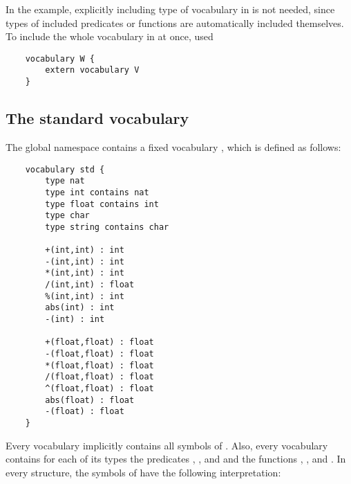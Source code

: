 
In the example, explicitly including type  of vocabulary  in  is not needed, since types of included predicates or functions are automatically included themselves.  To include the whole vocabulary  in  at once, used
\begin{lstlisting}
	vocabulary W {
		extern vocabulary V
	}
\end{lstlisting}




\subsection{The standard vocabulary}

The global namespace contains a fixed vocabulary , which is defined as follows:

\begin{lstlisting}
	vocabulary std {
		type nat	
		type int contains nat
		type float contains int
		type char
		type string contains char

		+(int,int) : int
		-(int,int) : int
		*(int,int) : int
		/(int,int) : float
		%(int,int) : int
		abs(int) : int
		-(int) : int
		
		+(float,float) : float
		-(float,float) : float
		*(float,float) : float
		/(float,float) : float
		^(float,float) : float
		abs(float) : float
		-(float) : float
	}
\end{lstlisting}
Every vocabulary implicitly contains all symbols of .  Also, every vocabulary contains for each of its types  the predicates , , and  and the functions , ,  and . In every structure, the symbols of  have the following interpretation:

